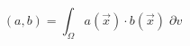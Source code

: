 \begin{equation}
\left(a,b\right) = \int_\Omega{a(\vec{x}) \cdot b(\vec{x})} \; {\partial v}
\end{equation}
